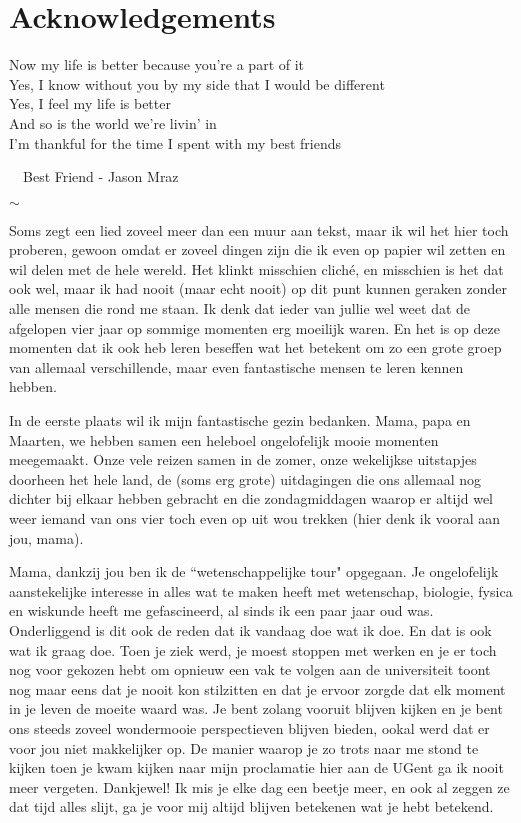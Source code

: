 \chapter*{Acknowledgements}

\parbox{10cm}{
Now my life is better because you're a part of it \\
Yes, I know without you by my side that I would be different \\
Yes, I feel my life is better \\
And so is the world we're livin' in \\
I'm thankful for the time I spent with my best friends
}
\begin{flushright}\faMusic\ \ Best Friend - Jason Mraz\end{flushright}

\vspace{0.25cm}
\begin{center}
    $\sim$
\end{center}
\vspace{0.25cm}

Soms zegt een lied zoveel meer dan een muur aan tekst, maar ik wil het hier toch proberen, gewoon omdat er zoveel dingen zijn die ik even op papier wil zetten en wil delen met de hele wereld.
Het klinkt misschien cliché, en misschien is het dat ook wel, maar ik had nooit (maar echt nooit) op dit punt kunnen geraken zonder alle mensen die rond me staan.
Ik denk dat ieder van jullie wel weet dat de afgelopen vier jaar op sommige momenten erg moeilijk waren.
En het is op deze momenten dat ik ook heb leren beseffen wat het betekent om zo een grote groep van allemaal verschillende, maar even fantastische mensen te leren kennen hebben.

In de eerste plaats wil ik mijn fantastische gezin bedanken.
Mama, papa en Maarten, we hebben samen een heleboel ongelofelijk mooie momenten meegemaakt.
Onze vele reizen samen in de zomer, onze wekelijkse uitstapjes doorheen het hele land, de (soms erg grote) uitdagingen die ons allemaal nog dichter bij elkaar hebben gebracht en die zondagmiddagen waarop er altijd wel weer iemand van ons vier toch even op uit wou trekken (hier denk ik vooral aan jou, mama).

Mama, dankzij jou ben ik de ``wetenschappelijke tour" opgegaan.
Je ongelofelijk aanstekelijke interesse in alles wat te maken heeft met wetenschap, biologie, fysica en wiskunde heeft me gefascineerd, al sinds ik een paar jaar oud was.
Onderliggend is dit ook de reden dat ik vandaag doe wat ik doe.
En dat is ook wat ik graag doe.
Toen je ziek werd, je moest stoppen met werken en je er toch nog voor gekozen hebt om opnieuw een vak te volgen aan de universiteit toont nog maar eens dat je nooit kon stilzitten en dat je ervoor zorgde dat elk moment in je leven de moeite waard was.
Je bent zolang vooruit blijven kijken en je bent ons steeds zoveel wondermooie perspectieven blijven bieden, ookal werd dat er voor jou niet makkelijker op.
De manier waarop je zo trots naar me stond te kijken toen je kwam kijken naar mijn proclamatie hier aan de UGent ga ik nooit meer vergeten.
Dankjewel!
Ik mis je elke dag een beetje meer, en ook al zeggen ze dat tijd alles slijt, ga je voor mij altijd blijven betekenen wat je hebt betekend.

